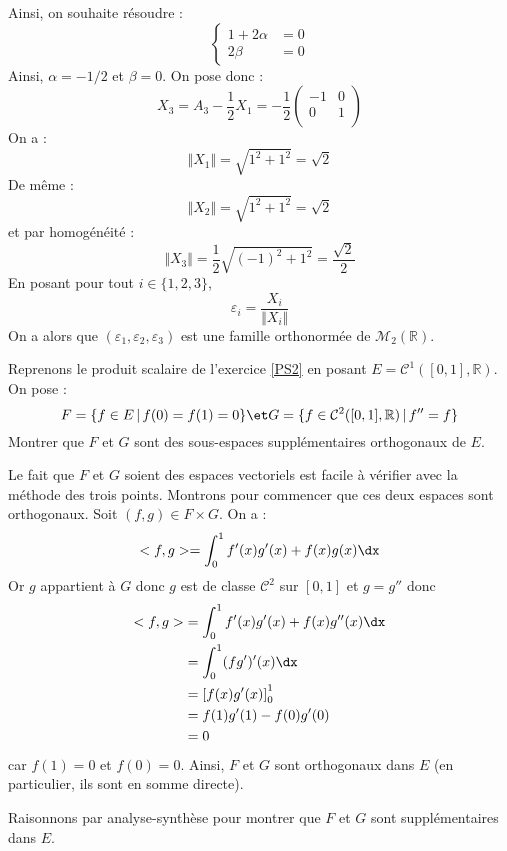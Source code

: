 \documentclass[a4paper,10pt]{report}
\begin{document}
Ainsi, on souhaite résoudre :
$$ \left\lbrace \begin{array}{rl}
1+ 2 \alpha & = 0 \\
2 \beta & = 0 
\end{array}\right.$$
Ainsi, $\alpha=-1/2$ et $\beta=0$.
On pose donc :
$$ X_3 = A_3 - \dfrac{1}{2} X_1 = -\dfrac{1}{2} \begin{pmatrix}
-1 & 0 \\
0 & 1 \\
\end{pmatrix}$$
On a :
$$ \Vert X_1 \Vert = \sqrt{1^2+1^2} = \sqrt{2}$$
De même :
$$ \Vert X_2 \Vert = \sqrt{1^2+1^2} = \sqrt{2}$$
et par homogénéité :
$$ \Vert X_3 \Vert = \dfrac{1}{2} \sqrt{(-1)^2+1^2} = \dfrac{\sqrt{2}}{2}$$
En posant pour tout $i \in \lbrace 1,2,3 \rbrace$,
$$ \varepsilon_i = \dfrac{X_i}{\Vert X_i \Vert}$$
On a alors que $(\varepsilon_1, \varepsilon_2, \varepsilon_3)$ est une famille orthonormée de $\mathcal{M}_2(\mathbb{R})$.

\begin{Exercice}{} Reprenons le produit scalaire de l'exercice \ref{PS2} en posant $E= \mathcal{C}^1([0,1],\mathbb{R})$. On pose :
$$ F = \lbrace f \in E \, \vert \, f(0)=f(1)=0\rbrace \et G= \lbrace f \in \mathcal{C}^2([0,1],\mathbb{R}) \, \vert \, f''=f \rbrace$$
Montrer que $F$ et $G$ sont des sous-espaces supplémentaires orthogonaux  de $E$.
\end{Exercice}

\corr Le fait que $F$ et $G$ soient des espaces vectoriels est facile à vérifier avec la méthode des trois points. Montrons pour commencer que ces deux espaces sont orthogonaux. Soit $(f,g) \in F \times G$. On a :
$$<f,g>= \int_{0}^1 f'(x)g'(x)+f(x)g(x) \dx$$
Or $g$ appartient à $G$ donc $g$ est de classe $\mathcal{C}^2$ sur $[0,1]$ et $g=g''$ donc 
\begin{align*}
 <f,g> & = \int_{0}^1 f'(x)g'(x)+f(x)g''(x) \dx \\
 & = \int_{0}^1 (fg')'(x) \dx \\
 &= \left[ f(x)g'(x) \right]_0^1 \\
 & = f(1)g'(1)-f(0)g'(0) \\
 & = 0
 \end{align*}
 car $f(1)=0$ et $f(0)=0$. Ainsi, $F$ et $G$ sont orthogonaux dans $E$ (en particulier, ils sont en somme directe).
 
 \medskip
 
 \noindent Raisonnons par analyse-synthèse pour montrer que $F$ et $G$ sont supplémentaires dans $E$.
 
\end{document}
